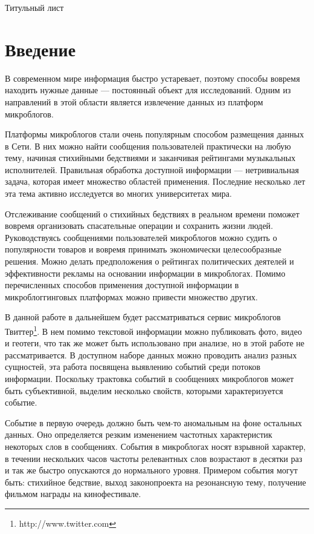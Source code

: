\documentclass[12pt, a4paper]{article}
\begin{document}
Титульный лист\thispagestyle{empty}\newpage

\tableofcontents\thispagestyle{empty}\newpage

  \section{Введение}
  	В современном мире информация быстро устаревает, поэтому способы вовремя находить нужные данные --- постоянный объект для исследований. Одним из направлений в этой области является извлечение данных из платформ микроблогов.
  	
  	Платформы микроблогов стали очень популярным способом размещения данных в Сети. В них можно найти сообщения пользователей практически на любую тему, начиная стихийными бедствиями и заканчивая рейтингами музыкальных исполнителей. Правильная обработка доступной информации --- нетривиальная задача, которая имеет множество областей применения. Последние несколько лет эта тема активно исследуется во многих университетах мира.
  	
	Отслеживание сообщений о стихийных бедствиях в реальном времени поможет вовремя организовать спасательные операции и сохранить жизни людей\cite{nuggets}. Руководствуясь сообщениями пользователей микроблогов можно судить о популярности товаров и вовремя принимать экономически целесообразные решения. Можно делать предположения о рейтингах политических деятелей и эффективности рекламы на основании информации в микроблогах. Помимо перечисленных способов применения доступной информации в микроблоггинговых платформах можно привести множество других.
	
	В данной работе в дальнейшем будет рассматриваться сервис микроблогов Твиттер\footnote{http://www.twitter.com}. В нем помимо текстовой информации можно публиковать фото, видео и геотеги, что так же может быть использовано при анализе, но в этой работе не рассматривается. В доступном наборе данных можно проводить анализ разных сущностей, эта работа посвящена выявлению событий среди потоков информации. Поскольку трактовка событий в сообщениях микроблогов может быть субъективной, выделим несколько свойств, которыми характеризуется событие.
	
	Событие в первую очередь должно быть чем-то аномальным на фоне остальных данных. Оно определяется резким изменением частотных характеристик некоторых слов в сообщениях. События в микроблогах носят взрывной характер, в течении нескольких часов частоты релевантных слов возрастают в десятки раз и так же быстро опускаются до нормального уровня. Примером события могут быть: стихийное бедствие, выход законопроекта на резонансную тему, получение фильмом награды на кинофестивале.
	
\end{document}
